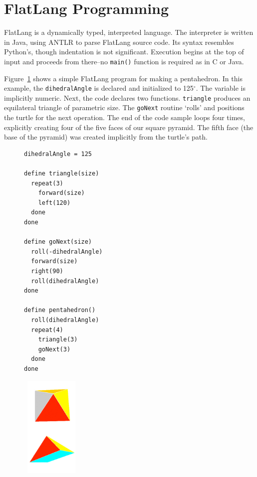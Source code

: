 \documentclass[times, 10pt,twocolumn]{article}
\makeatletter
\newenvironment{subfloat}%
{\def\caption##1{\gdef\subcapsave{\relax##1}}%
\let\subcapsave=\@empty %
\let\sf@oldlabel=\label 
\def\label##1{\xdef\sublabsave{\noexpand\label{##1}}}%
\let\sublabsave\relax %
\setbox\subfigbox\hbox 
\bgroup}%
{\egroup %
\let\label=\sf@oldlabel 
\subfigure[\subcapsave]{\box\subfigbox}}%
\makeatother
\begin{document}
\section{\nohyphens{FlatLang} Programming}

\nohyphens{FlatLang} is a dynamically typed, interpreted language. The
interpreter is written in Java, using ANTLR \cite{parr-antlr} to parse
\nohyphens{FlatLang} source code. Its syntax resembles Python's,
though indentation is not significant. Execution begins at the top of
input and proceeds from there--no \textnhtt{main()} function is
required as in C or Java.

Figure~\ref{fig:pentahedron} shows a simple \nohyphens{FlatLang}
program for making a pentahedron. In this example, the
\textnhtt{dihedralAngle} is declared and initialized to
125$^\circ$. The variable is implicitly numeric. Next, the code
declares two functions. \textnhtt{triangle} produces an equilateral
triangle of parametric size. The \textnhtt{goNext} routine `rolls' and
positions the turtle for the next operation. The end of the code
sample loops four times, explicitly creating four of the five faces of
our square pyramid. The fifth face (the base of the pyramid) was
created implicitly from the turtle's path.

\begin{figure} 
  \centering 
  \begin{subfloat}%
    \begin{minipage}{1.8in} 
      \small
\begin{verbatim}
dihedralAngle = 125

define triangle(size)
  repeat(3)
    forward(size)
    left(120)
  done
done

define goNext(size)
  roll(-dihedralAngle)
  forward(size)
  right(90)
  roll(dihedralAngle)
done

define pentahedron()
  roll(dihedralAngle)
  repeat(4)
    triangle(3)
    goNext(3)
  done
done
\end{verbatim}

    \end{minipage}%
  \end{subfloat} 
  \begin{minipage}{1.0in}
    \begin{subfloat}
      \includegraphics[width=1.0in]{pentahedron.pdf}
    \end{subfloat}
  \end{minipage}
  \caption{Low-level \nohyphens{FlatLang} code and graphics for a
    pentahedron, shown from two perspectives.}
    \label{fig:pentahedron}
\end{figure} 
\end{document}
